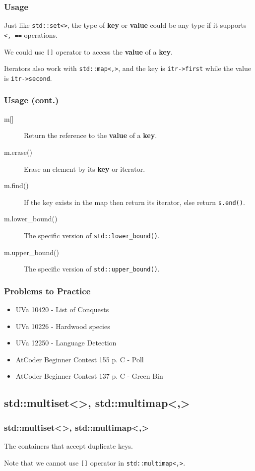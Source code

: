 \documentclass{beamer}
\begin{document}
\frame
{
	\frametitle{Usage}
	
	Just like \texttt{std::set<>}, the type of \textbf{key} or \textbf{value} could be any type if it supports \texttt{<, ==} operations.
	
	We could use \texttt{[]} operator to access the \textbf{value} of a \textbf{key}.
	
	Iterators also work with \texttt{std::map<,>}, and the key is \texttt{itr->first} while the value is \texttt{itr->second}.
}

\frame
{
	\frametitle{Usage (cont.)}
	
	\begin{description}
		\item[\ttfamily m[{]}] Return the reference to the \textbf{value} of a \textbf{key}.
		\item[\ttfamily m.erase()] Erase an element by its \textbf{key} or iterator.
		\item[\ttfamily m.find()] If the key exists in the map then return its iterator, else return \texttt{s.end()}.
		\item[\ttfamily m.lower\_bound()] The specific version of \texttt{std::lower\_bound()}.
		\item[\ttfamily m.upper\_bound()] The specific version of \texttt{std::upper\_bound()}.
	\end{description}
}

\frame
{
	\frametitle{Problems to Practice}
	
	\begin{itemize}
		\item UVa 10420 - List of Conquests
		\item UVa 10226 - Hardwood species
		\item UVa 12250 - Language Detection
		\item AtCoder Beginner Contest 155 p. C - Poll
		\item AtCoder Beginner Contest 137 p. C - Green Bin
	\end{itemize}
}

\subsection{std::multiset<>, std::multimap<,>}

\frame
{
	\frametitle{\ttfamily std::multiset<>, std::multimap<,>}
	
	The containers that accept duplicate keys.
	
	Note that we cannot use \texttt{[]} operator in \texttt{std::multimap<,>}.
}
\end{document}
